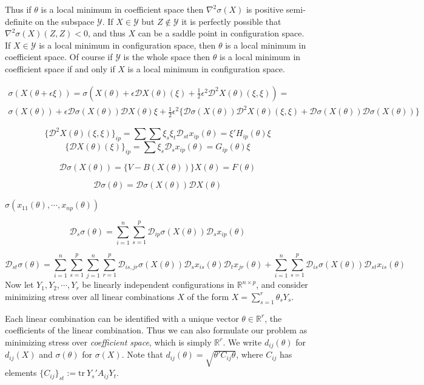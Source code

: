 \documentclass[
  12pt,
  letterpaper,
  DIV=11,
  numbers=noendperiod]{scrreprt}
\theoremstyle{remark}
\begin{document}
Thus if \(\theta\) is a local minimum in coefficient space then
\(\nabla^2\sigma(X)\) is positive semi-definite on the subspace
\(\mathcal{Y}\). If \(X\in\mathcal{Y}\) but \(Z\not\in\mathcal{Y}\) it
is perfectly possible that \(\nabla^2\sigma(X)(Z,Z)<0\), and thus \(X\)
can be a saddle point in configuration space. If \(X\in\mathcal{Y}\) is
a local minimum in configuration space, then \(\theta\) is a local
minimum in coefficient space. Of course if \(\mathcal{Y}\) is the whole
space then \(\theta\) is a local minimum in coefficient space if and
only if \(X\) is a local minimum in configuration space.

\begin{multline}
\sigma(X(\theta+\epsilon\xi))=\sigma(X(\theta)+\epsilon\mathcal{D}X(\theta)(\xi)+\frac12\epsilon^2\mathcal{D}^2X(\theta)(\xi,\xi))=\\
\sigma(X(\theta))+\epsilon\mathcal{D}\sigma(X(\theta))\mathcal{D}X(\theta)\xi+\frac12\epsilon^2\{\mathcal{D}\sigma(X(\theta))\mathcal{D}^2X(\theta)(\xi,\xi)+\mathcal{D}\sigma(X(\theta))\mathcal{D}\sigma(X(\theta))\}
\end{multline}

\[
\{\mathcal{D}^2X(\theta)(\xi,\xi)\}_{ip}=\sum\sum\xi_s\xi_t\mathcal{D}_{st}x_{ip}(\theta)=\xi'H_{ip}(\theta)\xi
\] \[
\{\mathcal{D}X(\theta)(\xi)\}_{ip}=\sum\xi_s\mathcal{D}_sx_{ip}(\theta)=G_{ip}(\theta)\xi
\]

\[
\mathcal{D}\sigma(X(\theta))=\{V-B(X(\theta))\}X(\theta)=F(\theta)
\]

\[
\mathcal{D}\sigma(\theta)=\mathcal{D}\sigma(X(\theta))\mathcal{D}X(\theta)
\]

\(\sigma(x_{11}(\theta),\cdots,x_{np}(\theta))\)

\[
\mathcal{D}_s\sigma(\theta)=\sum_{i=1}^n\sum_{s=1}^p\mathcal{D}_{ip}\sigma(X(\theta))\mathcal{D}_sx_{ip}(\theta)
\]

\[
\mathcal{D}_{st}\sigma(\theta)=\sum_{i=1}^n\sum_{s=1}^p
\sum_{j=1}^n\sum_{r=1}^p\mathcal{D}_{is,jr}\sigma(X(\theta))\mathcal{D}_sx_{is}(\theta)\mathcal{D}_tx_{jr}(\theta)
+\sum_{i=1}^n\sum_{s=1}^p\mathcal{D}_{is}\sigma(X(\theta))\mathcal{D}_{st}x_{is}(\theta)
\] Now let \(Y_1,Y_2,\cdots,Y_r\) be linearly independent configurations
in \(\mathbb{R}^{n\times p}\), and consider minimizing stress over all
linear combinations \(X\) of the form \(X=\sum_{s=1}^r \theta_sY_s\).

Each linear combination can be identified with a unique vector
\(\theta\in\mathbb{R}^r\), the coefficients of the linear combination.
Thus we can also formulate our problem as minimizing stress over
\emph{coefficient space}, which is simply \(\mathbb{R}^r\). We write
\(d_{ij}(\theta)\) for \(d_{ij}(X)\) and \(\sigma(\theta)\) for
\(\sigma(X)\). Note that \(d_{ij}(\theta)=\sqrt{\theta'C_{ij}\theta}\),
where \(C_{ij}\) has elements
\(\{C_{ij}\}_{st}:=\text{tr}\ Y_s'A_{ij}Y_t\).
\end{document}
